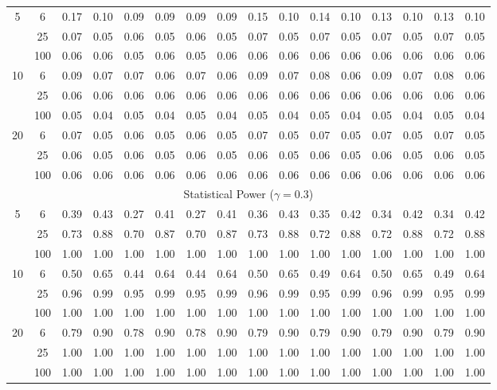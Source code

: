 \documentclass[
  man]{apa6}
\newenvironment{lltable}{\begin{landscape}\centering\begin{ThreePartTable}}{\end{ThreePartTable}\end{landscape}}
\begin{document}
\begin{lltable}
{\begin{longtable}{cccccccccccccccc}
5 & 6 & 0.17 & 0.10 & 0.09 & 0.09 & 0.09 & 0.09 & 0.15 & 0.10 & 0.14 & 0.10 & 0.13 & 0.10 & 0.13 & 0.10\\
 & 25 & 0.07 & 0.05 & 0.06 & 0.05 & 0.06 & 0.05 & 0.07 & 0.05 & 0.07 & 0.05 & 0.07 & 0.05 & 0.07 & 0.05\\
 & 100 & 0.06 & 0.06 & 0.05 & 0.06 & 0.05 & 0.06 & 0.06 & 0.06 & 0.06 & 0.06 & 0.06 & 0.06 & 0.06 & 0.06\\
10 & 6 & 0.09 & 0.07 & 0.07 & 0.06 & 0.07 & 0.06 & 0.09 & 0.07 & 0.08 & 0.06 & 0.09 & 0.07 & 0.08 & 0.06\\
 & 25 & 0.06 & 0.06 & 0.06 & 0.06 & 0.06 & 0.06 & 0.06 & 0.06 & 0.06 & 0.06 & 0.06 & 0.06 & 0.06 & 0.06\\
 & 100 & 0.05 & 0.04 & 0.05 & 0.04 & 0.05 & 0.04 & 0.05 & 0.04 & 0.05 & 0.04 & 0.05 & 0.04 & 0.05 & 0.04\\
20 & 6 & 0.07 & 0.05 & 0.06 & 0.05 & 0.06 & 0.05 & 0.07 & 0.05 & 0.07 & 0.05 & 0.07 & 0.05 & 0.07 & 0.05\\
 & 25 & 0.06 & 0.05 & 0.06 & 0.05 & 0.06 & 0.05 & 0.06 & 0.05 & 0.06 & 0.05 & 0.06 & 0.05 & 0.06 & 0.05\\
 & 100 & 0.06 & 0.06 & 0.06 & 0.06 & 0.06 & 0.06 & 0.06 & 0.06 & 0.06 & 0.06 & 0.06 & 0.06 & 0.06 & 0.06\\
\multicolumn{16}{c}{Statistical Power ($\gamma = 0.3$)}\\
5 & 6 & 0.39 & 0.43 & 0.27 & 0.41 & 0.27 & 0.41 & 0.36 & 0.43 & 0.35 & 0.42 & 0.34 & 0.42 & 0.34 & 0.42\\
 & 25 & 0.73 & 0.88 & 0.70 & 0.87 & 0.70 & 0.87 & 0.73 & 0.88 & 0.72 & 0.88 & 0.72 & 0.88 & 0.72 & 0.88\\
 & 100 & 1.00 & 1.00 & 1.00 & 1.00 & 1.00 & 1.00 & 1.00 & 1.00 & 1.00 & 1.00 & 1.00 & 1.00 & 1.00 & 1.00\\
10 & 6 & 0.50 & 0.65 & 0.44 & 0.64 & 0.44 & 0.64 & 0.50 & 0.65 & 0.49 & 0.64 & 0.50 & 0.65 & 0.49 & 0.64\\
 & 25 & 0.96 & 0.99 & 0.95 & 0.99 & 0.95 & 0.99 & 0.96 & 0.99 & 0.95 & 0.99 & 0.96 & 0.99 & 0.95 & 0.99\\
 & 100 & 1.00 & 1.00 & 1.00 & 1.00 & 1.00 & 1.00 & 1.00 & 1.00 & 1.00 & 1.00 & 1.00 & 1.00 & 1.00 & 1.00\\
20 & 6 & 0.79 & 0.90 & 0.78 & 0.90 & 0.78 & 0.90 & 0.79 & 0.90 & 0.79 & 0.90 & 0.79 & 0.90 & 0.79 & 0.90\\
 & 25 & 1.00 & 1.00 & 1.00 & 1.00 & 1.00 & 1.00 & 1.00 & 1.00 & 1.00 & 1.00 & 1.00 & 1.00 & 1.00 & 1.00\\
 & 100 & 1.00 & 1.00 & 1.00 & 1.00 & 1.00 & 1.00 & 1.00 & 1.00 & 1.00 & 1.00 & 1.00 & 1.00 & 1.00 & 1.00\\

\end{longtable}}
\end{lltable}
\end{document}

